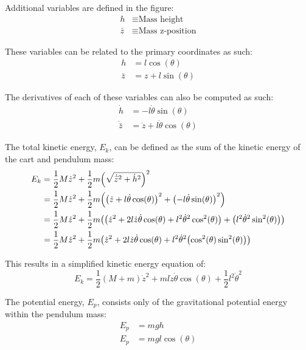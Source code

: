\documentclass[]{article}
\begin{document}
		Additional variables are defined in the figure:
		\begin{align*}
			h &\equiv \text{Mass height}\\
			\bar{z} &\equiv \text{Mass z-position}
		\end{align*} 
		
		These variables can be related to the primary coordinates as such:
		\begin{align}
			h		&= l \cos(\theta) \label{eq:h_def}\\
			\bar{z} &= z + l \sin(\theta) \label{eq:z_def}	
		\end{align}
		
		The derivatives of each of these variables can also be computed as such:
		\begin{align}
			\dot{h} &= -l \dot{\theta} \sin(\theta) \label{eq:h_dot}\\
			\dot{\bar{z}} &= \dot{z} + l \dot{\theta}\cos(\theta) \label{eq:z}
		\end{align}
		
		The total kinetic energy, $E_k$, can be defined as the sum of the kinetic energy of the cart and pendulum mass:
		\begin{align}
			E_k &= \frac{1}{2} M \dot{z}^2 + \frac{1}{2} m \qty(\sqrt{\dot{\bar{z}}^2 + \dot{h}^2})^2 \label{eq:E_k_original}\\
				&= \frac{1}{2} M \dot{z}^2 + \frac{1}{2} m \qty(\qty(\dot{z} + l \dot{\theta}\cos(\theta))^2 + \qty(-l \dot{\theta} \sin(\theta))^2)\nonumber\\
				&= \frac{1}{2} M \dot{z}^2 + \frac{1}{2} m \qty(\qty(\dot{z}^2 + 2 l \dot{z} \dot{\theta}\cos(\theta) + l^2 \dot{\theta}^2 \cos[2](\theta)) + \qty(l^2 \dot{\theta}^2 \sin[2](\theta)))\nonumber\\
				&= \frac{1}{2} M \dot{z}^2 + \frac{1}{2} m \qty(\dot{z}^2 + 2 l \dot{z} \dot{\theta}\cos(\theta) + l^2 \dot{\theta}^2 \qty(\cos[2](\theta)\sin[2](\theta)))\nonumber
		\end{align}
		
		This results in a simplified kinetic energy equation of:
		\begin{equation}
				E_k = \frac{1}{2} (M + m) \dot{z}^2 + m l \dot{z} \dot{\theta}\cos(\theta) + \frac{1}{2} l^2 \dot{\theta}^2
				\label{eq:E_k_simplified}
		\end{equation}
		
		The potential energy, $E_p$, consists only of the gravitational potential energy within the pendulum mass:
		\begin{align}
			E_p &= m g h\\
			E_p &= m g l \cos(\theta) \label{eq:E_p}
		\end{align}
		
\end{document}
